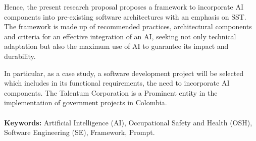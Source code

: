 Hence, the present research proposal proposes a framework to incorporate AI components into pre-existing software architectures with an emphasis on SST. The framework is made up of recommended practices, architectural components and criteria for an effective integration of an AI, seeking not only technical adaptation but also the maximum use of AI to guarantee its impact and durability.

In particular, as a case study, a software development project will be selected which includes in its functional requirements, the need to incorporate AI components. The Talentum Corporation is a
Prominent entity in the implementation of government projects in
Colombia.





\paragraph*{}{\textbf{Keywords:}}
Artificial Intelligence (AI), Occupational Safety and Health (OSH), Software Engineering (SE), Framework, Prompt.